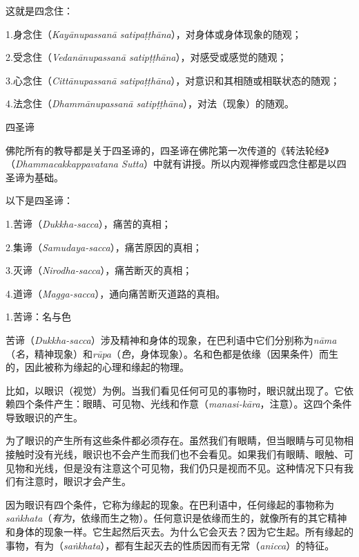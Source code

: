 这就是四念住：

{
\leftskip=1.6pc
\item{1.}身念住（{\it Kay\=anupassan\=a satipa\d t\d th\=ana}），对身体或身体现象的随观；
\item{2.}受念住（{\it Vedan\=anupassan\=a satip\d t\d th\=ana}），对感受或感觉的随观；
\item{3.}心念住（{\it Citt\=anupassan\=a satipa\d t\d th\=ana}），对意识和其相随或相联状态的随观；
\item{4.}\1法念住（{\it Dhamm\=anupassan\=a satip\d t\d th\=ana}），对法（现象）的随观。

}

\ssubsectnon 四圣谛

佛陀所有的教导都是关于四圣谛的，四圣谛在佛陀第一次传道的《转法轮经》（{\it Dhammacakkappavatana Sutta}）中就有讲授。所以内观禅修或四念住都是以四圣谛为基础。

以下是四圣谛：

{
\leftskip=1.6pc
\item{1.}苦谛（{\it Dukkha-sacca}），痛苦的真相；
\item{2.}集谛（{\it Samudaya-sacca}），痛苦原因的真相；
\item{3.}灭谛（{\it Nirodha-sacca}），痛苦断灭的真相；
\item{4.}道谛（{\it Magga-sacca}），通向痛苦断灭道路的真相。

}

\sssubsectnon 1.苦谛：名与色

苦谛（{\it Dukkha-sacca}）涉及精神和身体的现象，在巴利语中它们分别称为{\it n\=ama}（{\it 名}，精神现象）和{\it r\=upa}（{\it 色}，身体现象）。名和色都是依缘（因果条件）而生的，因此被称为缘起的心理和缘起的物理。

比如，以眼识（视觉）为例。当我们看见任何可见的事物时，眼识就出现了。它依赖四个条件产生：眼睛、可见物、光线和作意（{\it manasi-k\=ara}，注意）。这四个条件导致眼识的产生。

\1为了眼识的产生所有这些条件都必须存在。虽然我们有眼睛，但当眼睛与可见物相接触时没有光线，眼识也不会产生而我们也不会看见。如果我们有眼睛、眼触、可见物和光线，但是没有注意这个可见物，我们仍只是视而不见。这种情况下只有我们有注意时，眼识才会产生。

因为眼识有四个条件，它称为缘起的现象。在巴利语中，任何缘起的事物称为{\it sa\.nkhata}（{\it 有为}，依缘而生之物）。任何意识是依缘而生的，就像所有的其它精神和身体的现象一样。它生起然后灭去。为什么它会灭去？因为它生起。所有缘起的事物，有为（{\it sa\.nkhata}），都有生起灭去的性质因而有无常（{\it anicca}）的特征。

